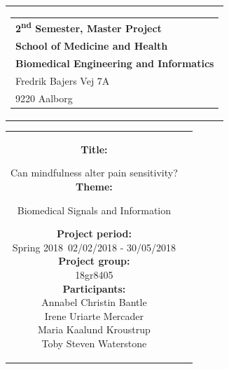 % 
\thispagestyle{empty}
\begin{titlepage}
\begin{nopagebreak}
{\samepage 

\begin{tabular}{r}
\parbox{\textwidth}{  
\hfill \hspace{2cm} \parbox{8cm}{\begin{tabular}{l} %
{\small \textbf{\textcolor{aaublue}{{2\textsuperscript{nd} Semester, Master Project}}}}\\
{\small \textbf{\textcolor{aaublue}{School of Medicine and Health}}}\\
{\small \textbf{\textcolor{aaublue}{Biomedical Engineering and Informatics}}}\\
{\small \textcolor{aaublue}{Fredrik Bajers Vej 7A}} \\
{\small \textcolor{aaublue}{9220 Aalborg}} \\
\end{tabular}}}
\end{tabular}

\begin{tabular}{cc}
\parbox{7cm}{

\textbf{Title:}

Can mindfulness alter pain sensitivity? \\ 

\textbf{Theme:}

\small{
 Biomedical Signals and Information\\
}


\parbox{8cm}{


\textbf{Project period:}\\
Spring 2018\
02/02/2018 - 30/05/2018\\
   
\textbf{Project group: }\\
18gr8405 \\
  
\textbf{Participants:}\\
Annabel Christin Bantle \\
Irene Uriarte Mercader \\
Maria Kaalund Kroustrup \\
Toby Steven Waterstone \\


}}
\end{tabular}}
\end{nopagebreak}
\end{titlepage}
